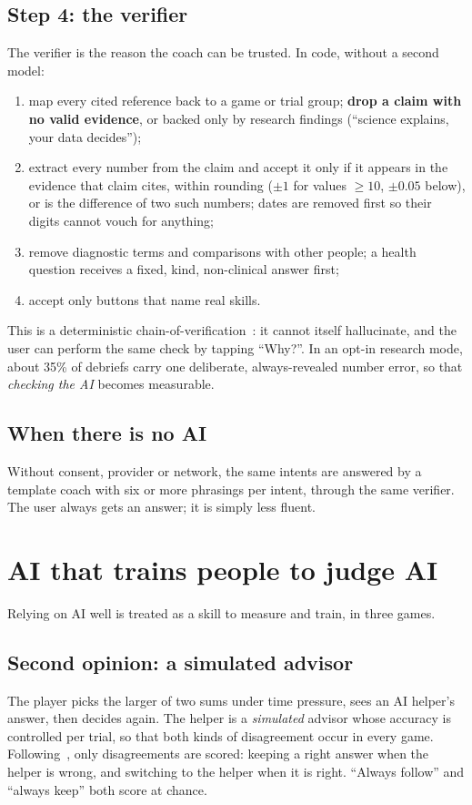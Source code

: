 \documentclass[11pt,a4paper]{article}
\begin{document}
\subsection{Step 4: the verifier}
The verifier is the reason the coach can be trusted. In code, without a second model:
\begin{enumerate}
\item map every cited reference back to a game or trial group; \textbf{drop a claim with no valid evidence}, or backed only by research findings (``science explains, your data decides'');
\item extract every number from the claim and accept it only if it appears in the evidence that claim cites, within rounding ($\pm1$ for values $\ge10$, $\pm0.05$ below), or is the difference of two such numbers; dates are removed first so their digits cannot vouch for anything;
\item remove diagnostic terms and comparisons with other people; a health question receives a fixed, kind, non-clinical answer first;
\item accept only buttons that name real skills.
\end{enumerate}
This is a deterministic chain-of-verification~\cite{cove}: it cannot itself hallucinate, and the user can perform the same check by tapping ``Why?''. In an opt-in research mode, about 35\% of debriefs carry one deliberate, always-revealed number error, so that \emph{checking the AI} becomes measurable.

\subsection{When there is no AI}
Without consent, provider or network, the same intents are answered by a template coach with six or more phrasings per intent, through the same verifier. The user always gets an answer; it is simply less fluent.

\section{AI that trains people to judge AI}
\label{sec:collab}

Relying on AI well is treated as a skill to measure and train, in three games.

\subsection{Second opinion: a simulated advisor}
The player picks the larger of two sums under time pressure, sees an AI helper's answer, then decides again. The helper is a \emph{simulated} advisor whose accuracy is controlled per trial, so that both kinds of disagreement occur in every game. Following~\cite{schemmer}, only disagreements are scored: keeping a right answer when the helper is wrong, and switching to the helper when it is right. ``Always follow'' and ``always keep'' both score at chance.
\end{document}
